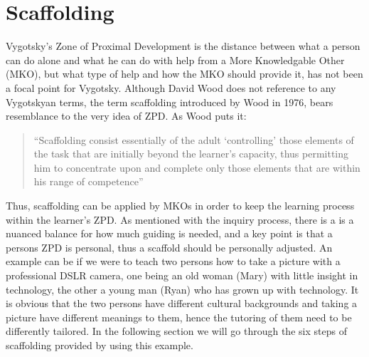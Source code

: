 \section{Scaffolding}
Vygotsky’s Zone of Proximal Development is the distance between what a person can do alone and what he can do with help from a More Knowledgable Other (MKO), but what type of help and how the MKO should provide it, has not been a focal point for Vygotsky. Although David Wood does not reference to any Vygotskyan terms, the term scaffolding introduced by Wood in 1976, bears resemblance to the very idea of ZPD. As Wood puts it:

\begin{quote}“Scaffolding consist essentially of the adult ‘controlling’ those elements of the task that are initially beyond the learner’s capacity, thus permitting him to concentrate upon and complete only those elements that are within his range of competence” \citep{wood1976role}
\end{quote}

Thus, scaffolding can be applied by MKOs in order to keep the learning process within the learner’s ZPD. As mentioned with the inquiry process, there is a is a nuanced balance for how much guiding is needed, and a key point is that a persons ZPD is personal, thus a scaffold should be personally adjusted. An example can be if we were to teach two persons how to take a picture with a professional DSLR camera, one being an old woman (Mary) with little insight in technology, the other a young man (Ryan) who has grown up with technology. It is obvious that the two persons have different cultural backgrounds and taking a picture have different meanings to them, hence the tutoring of them need to be differently tailored. In the following section we will go through the six steps of scaffolding provided by \citet{wood1976role} using this example.

